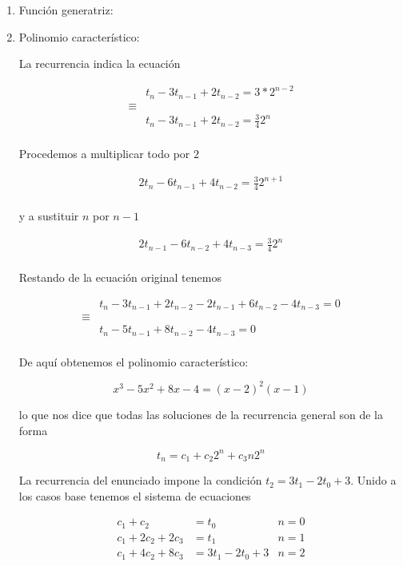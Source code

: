 \documentclass{article}
\begin{document}
\begin{enumerate}

\item Función generatriz:

\item Polinomio característico:

La recurrencia indica la ecuación

\begin{align*}
& t_n - 3t_{n-1} + 2t_{n-2} = 3*2^{n-2} \\
\equiv & \\
& t_n - 3t_{n-1} + 2t_{n-2} = \frac{3}{4} 2^n \\
\end{align*}

Procedemos a multiplicar todo por $2$

\begin{align*}
2t_n - 6t_{n-1} + 4t_{n-2} = \frac{3}{4} 2^{n+1} \\
\end{align*}

y a sustituir $n$ por $n-1$

\begin{align*}
2t_{n-1} - 6t_{n-2} + 4t_{n-3} = \frac{3}{4} 2^{n} \\
\end{align*}

Restando de la ecuación original tenemos

\begin{align*}
& t_n - 3t_{n-1} +2t_{n-2} -2t_{n-1}+6t_{n-2}-4t_{n-3} = 0 \\
\equiv & \\
& t_n - 5t_{n-1} + 8t_{n-2}-4t_{n-3} = 0 \\
\end{align*}

De aquí obtenemos el polinomio característico:

\[
x^3-5x^2+8x-4 = (x-2)^2(x-1)
\]

lo que nos dice que todas las soluciones de la recurrencia general son de la
forma

\[
t_n = c_1 + c_2 2^n + c_3 n 2^n
\]

La recurrencia del enunciado impone la condición $t_2 = 3t_1-2t_0+3$. Unido a
los casos base tenemos el sistema de ecuaciones

\begin{align*}
c_1 + c_2 & = t_0 & n = 0 \\
c_1+2c_2 + 2c_3 & = t_1 & n = 1 \\
c_1+4c_2+8c_3 & = 3t_1-2t_0+3 & n = 2 \\
\end{align*}


\end{enumerate}
\end{document}
